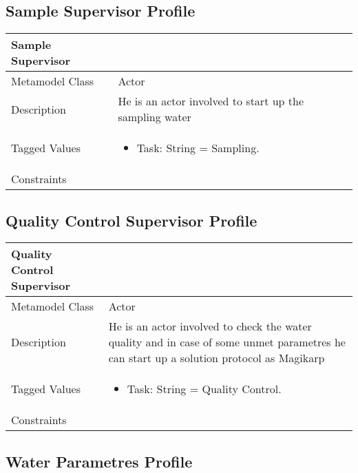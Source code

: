 \subsection{Sample Supervisor Profile}

\begin{longtable}{|p{7cm}|p{7cm}|}

\hline
\textbf{Sample Supervisor} & \\


\hline
Metamodel Class & Actor\\

\hline
Description & He is an actor involved to start up the sampling water\\

\hline
Tagged Values & 
\begin{itemize}
\item Task: String = Sampling.
\end{itemize}\\

\hline
Constraints &\\

\hline
\end{longtable}


\subsection{Quality Control Supervisor Profile}

\begin{longtable}{|p{7cm}|p{7cm}|}

\hline
\textbf{Quality Control Supervisor} & \\


\hline
Metamodel Class & Actor\\

\hline
Description & He is an actor involved to check the water quality and in case of some unmet parametres he can start up a solution protocol as Magikarp\\

\hline
Tagged Values & 
\begin{itemize}
\item Task: String = Quality Control.
\end{itemize}\\

\hline
Constraints &\\

\hline
\end{longtable}

\subsection{Water Parametres Profile}

